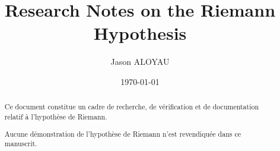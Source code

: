 \documentclass[11pt,a4paper]{article}
\title{Research Notes on the Riemann Hypothesis}
\author{Jason ALOYAU}
\date{\today}
\theoremstyle{definition}
\theoremstyle{remark}
\begin{document}
\maketitle

\begin{abstract}
Ce document constitue un cadre de recherche,
de vérification et de documentation relatif à
l'hypothèse de Riemann.

Aucune démonstration de l'hypothèse de Riemann
n'est revendiquée dans ce manuscrit.
\end{abstract}

\tableofcontents











\end{document}
